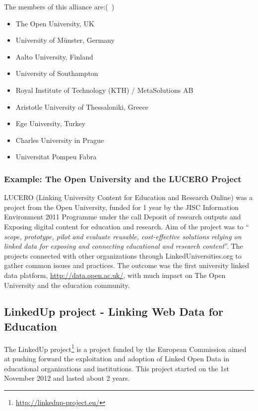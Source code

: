 \documentclass{article}
\begin{document}
The members of this alliance are:(~\cite{daquin_members_2014})
\begin{itemize}
	\item The Open University, UK
	\item University of Münster, Germany
	\item Aalto University, Finland
	\item University of Southampton
	\item Royal Institute of Technology (KTH) / MetaSolutions AB
	\item Aristotle University of Thessaloniki, Greece
	\item Ege University, Turkey
	\item Charles University in Prague
	\item Universitat Pompeu Fabra
\end{itemize}

\subsubsection{Example: The Open University and the LUCERO Project}
LUCERO (Linking University Content for Education and Research Online) was a project from the Open University, funded for 1 year by the JISC Information Environment 2011 Programme under the call Deposit of research outputs and Exposing digital content for education and research. Aim of the project was to "` \textit{ scope, prototype, pilot and evaluate reusable, cost-effective solutions relying on linked data for exposing and connecting educational and research content}"'.\cite{daquin_lucero_2010} The projects connected with other organizations through LinkedUniversities.org to gather common issues and practices. The outcome was the first university linked data platform, \url{http://data.open.ac.uk/}, with much impact on The Open University and the education community.

\subsection{LinkedUp project - Linking Web Data for Education}
\label{related-work:linkedup}
The LinkedUp project\footnote{\url{http://linkedup-project.eu/}} is a project funded by the European Commission aimed at pushing forward the exploitation and adoption of Linked Open Data in educational organizations and institutions. This project started on the 1st November 2012 and lasted about 2 years. 
\end{document}
